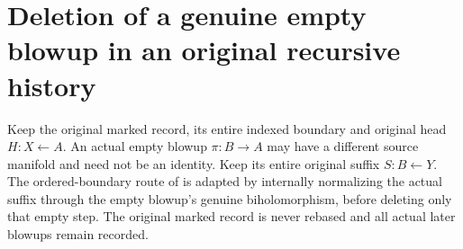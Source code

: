 \section{Deletion of a genuine empty blowup in an original recursive history}

Keep the original marked record, its entire indexed boundary and original head
$H:X\leftarrow A$. An actual empty blowup $\pi:B\to A$ may have a different
source manifold and need not be an identity. Keep its entire original suffix
$S:B\leftarrow Y$. The ordered-boundary route of
\cite{wlodarczyk05-hironaka,bierstone-milman08-functoriality} is adapted by
internally normalizing the actual suffix through the empty blowup's genuine
biholomorphism, before deleting only that empty step. The original marked
record is never rebased and all actual later blowups remain recorded.

